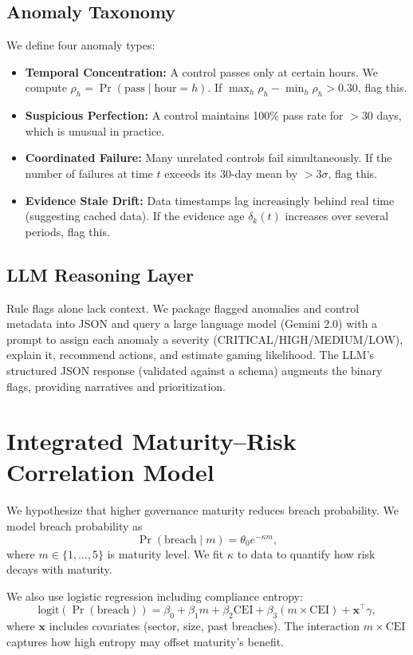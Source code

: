 \documentclass[conference]{IEEEtran}
\newcommand{\CEI}{\mathrm{CEI}}
\newcommand{\bx}{\mathbf{x}}
\newcommand{\logit}{\mathrm{logit}}
\begin{document}
\subsection{Anomaly Taxonomy}
We define four anomaly types:
\begin{itemize}
  \item \textbf{Temporal Concentration:} A control passes only at certain hours. We compute $\rho_h = \Pr(\text{pass}\mid \text{hour}=h)$. If $\max_h \rho_h - \min_h \rho_h > 0.30$, flag this.
  \item \textbf{Suspicious Perfection:} A control maintains 100\% pass rate for $>30$ days, which is unusual in practice.
  \item \textbf{Coordinated Failure:} Many unrelated controls fail simultaneously. If the number of failures at time $t$ exceeds its 30-day mean by $>3\sigma$, flag this.
  \item \textbf{Evidence Stale Drift:} Data timestamps lag increasingly behind real time (suggesting cached data). If the evidence age $\delta_k(t)$ increases over several periods, flag this.
\end{itemize}

\subsection{LLM Reasoning Layer}
Rule flags alone lack context. We package flagged anomalies and control metadata into JSON and query a large language model (Gemini 2.0) with a prompt to assign each anomaly a severity (CRITICAL/HIGH/MEDIUM/LOW), explain it, recommend actions, and estimate gaming likelihood. The LLM’s structured JSON response (validated against a schema) augments the binary flags, providing narratives and prioritization.

\section{Integrated Maturity--Risk Correlation Model}
\label{sec:maturity}
We hypothesize that higher governance maturity reduces breach probability. We model breach probability as
\[
  \Pr(\text{breach}\mid m) = \theta_0 e^{-\kappa m},
  \label{eq:maturity_model}
\]
where $m\in\{1,\dots,5\}$ is maturity level. We fit $\kappa$ to data to quantify how risk decays with maturity.

We also use logistic regression including compliance entropy:
\[
  \logit(\Pr(\text{breach})) = \beta_0 + \beta_1 m + \beta_2 \CEI + \beta_3(m\times \CEI) + \bx^\top \gamma,
  \label{eq:logistic}
\]
where $\bx$ includes covariates (sector, size, past breaches). The interaction $m\times \CEI$ captures how high entropy may offset maturity's benefit.
\end{document}
